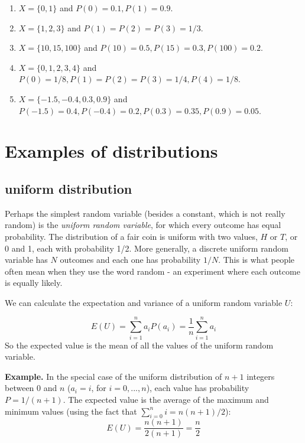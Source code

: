 \documentclass[
  letterpaper,
  DIV=11,
  numbers=noendperiod]{scrreprt}
\begin{document}
\begin{enumerate}
\def\labelenumi{\arabic{enumi}.}
\item
  \(X=\{0, 1\}\) and \(P(0) = 0.1, P(1) = 0.9\).
\item
  \(X=\{1,2,3\}\) and \(P(1) = P(2) = P(3)=1/3\).
\item
  \(X=\{10, 15, 100\}\) and \(P(10) = 0.5, P(15) = 0.3, P(100)=0.2\).
\item
  \(X=\{0, 1, 2, 3, 4\}\) and
  \(P(0) = 1/8, P(1) = P(2) = P(3) = 1/4, P(4) = 1/8\).
\item
  \(X=\{-1.5, -0.4, 0.3, 0.9\}\) and
  \(P(-1.5) = 0.4, P(-0.4) = 0.2, P(0.3) = 0.35, P(0.9) = 0.05\).
\end{enumerate}

\hypertarget{examples-of-distributions}{%
\section{Examples of distributions}\label{examples-of-distributions}}

\label{sec:math4_2}

\hypertarget{uniform-distribution}{%
\subsection{uniform distribution}\label{uniform-distribution}}

Perhaps the simplest random variable (besides a constant, which is not
really random) is the \emph{uniform random variable}, for which every
outcome has equal probability. The distribution of a fair coin is
uniform with two values, \(H\) or \(T\), or 0 and 1, each with
probability 1/2. More generally, a discrete uniform random variable has
\(N\) outcomes and each one has probability \(1/N\). This is what people
often mean when they use the word random - an experiment where each
outcome is equally likely.

We can calculate the expectation and variance of a uniform random
variable \(U\):

\[
E(U) = \sum_{i=1}^n  a_i P(a_i) = \frac{1}{n}  \sum_{i=1}^n  a_i 
\] So the expected value is the mean of all the values of the uniform
random variable.

\textbf{Example.} In the special case of the uniform distribution of
\(n+1\) integers between 0 and \(n\) (\(a_i = i\), for \(i=0,..., n\)),
each value has probability \(P = 1/(n+1)\). The expected value is the
average of the maximum and minimum values (using the fact that
\(\sum_{i=0}^n i = n(n+1)/2\)):
\[ E(U) = \frac{n(n+1)}{2(n+1)} = \frac{n}{2} \]
\end{document}
